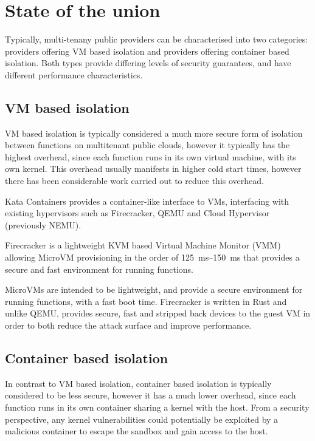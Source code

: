 \section{State of the \faas{} union}
Typically, multi-tenany public \faas{} providers can be characterised into two categories: providers offering VM based isolation\cite{agacheFirecrackerLightweightVirtualization2020} and providers offering container based isolation\cite{GVisor}. Both types provide differing levels of security guarantees, and have different performance characteristics.

\subsection{VM based isolation}
VM based isolation is typically considered a much more secure form of isolation between \faas{} functions on multitenant public clouds\cite{jithinVirtualMachineIsolation2014}, however it typically has the highest overhead, since each function runs in its own virtual machine, with its own kernel. This overhead usually manifests in higher cold start times, however there has been considerable work carried out to reduce this overhead\cite{razaviPrebakedUVMsScalable2015,agacheFirecrackerLightweightVirtualization2020,dawXanaduMitigatingCascading2020,oliverstenbomRefunctionEliminatingServerless2019}.

Kata Containers\cite{KataContainersOpen} provides a container-like interface to VMs, interfacing with existing hypervisors such as Firecracker\cite{agacheFirecrackerLightweightVirtualization2020}, QEMU\cite{QEMU} and Cloud Hypervisor\cite{CloudhypervisorCloudhypervisorVirtual} (previously NEMU\cite{IntelNemu2024}).

Firecracker \cite{agacheFirecrackerLightweightVirtualization2020} is a lightweight KVM\cite{KVM} based Virtual Machine Monitor (VMM) allowing MicroVM provisioning in the order of \qtyrange{125}{150}{\ms} that provides a secure and fast environment for running \faas{} functions.

MicroVMs are intended to be lightweight, and provide a secure environment for running functions, with a fast boot time. Firecracker is written in Rust and unlike QEMU, provides secure, fast and stripped back devices to the guest VM in order to both reduce the attack surface and improve performance\cite{jainStudyFirecrackerMicroVM2020}.

\subsection{Container based isolation}
In contrast to VM based isolation, container based isolation is typically considered to be less secure\cite{DemystifyingContainerVs}, however it has a much lower overhead, since each function runs in its own container sharing a kernel with the host\cite{WhatContainerDocker}. From a security perspective, any kernel vulnerabilities could potentially be exploited by a malicious container to escape the sandbox and gain access to the host\cite{linMeasurementStudyLinux2018}.

